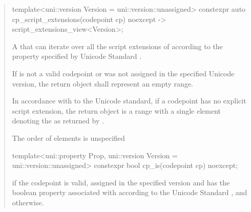 \documentclass{wg21}
\begin{document}
\begin{quote}
\begin{itemdescr}
\end{itemdescr}

\begin{itemdecl}
template<uni::version Version = uni::version::unassigned>
constexpr auto cp_script_extensions(codepoint cp) noexcept
-> script_extensions_view<Version>;
\end{itemdecl}

\begin{itemdescr}

\mandates {}

\returns A  that can iterate over all the script extensions of
 according to the  property specified by  Unicode Standard .

If  is not a valid codepoint or was not assigned in the specified Unicode version, the return object shall represent an empty range.

\begin{note}
In accordance with to the Unicode standard, if a codepoint has no explicit script extension, the return object is a range with a single element denoting the  as returned by .
\end{note}

\begin{note}
The order of elements is unspecified
\end{note}

\end{itemdescr}

\begin{itemdecl}
template<uni::property Prop, uni::version Version = uni::version::unassigned>
constexpr bool cp_is(codepoint cp) noexcept;
\end{itemdecl}

\begin{itemdescr}

\mandates {}

\returns {} if the codepoint  is valid, assigned in the specified version and has the boolean property associated with  according to the Unicode Standard ,
and  otherwise.

\end{itemdescr}



\end{quote}
\end{document}
